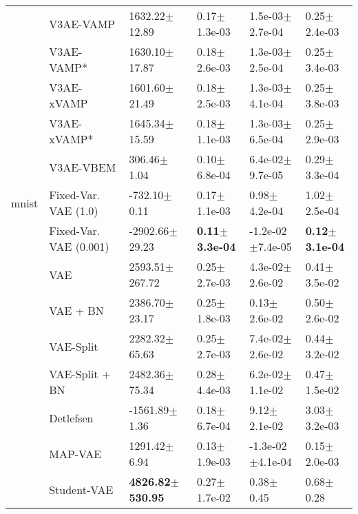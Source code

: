 \begin{tabular}{llllll}
             & V3AE-VAMP &            1632.22$\pm$12.89 &              0.17$\pm$1.3e-03 &            1.5e-03$\pm$2.7e-04 &              0.25$\pm$2.4e-03 \\
             & V3AE-VAMP* &            1630.10$\pm$17.87 &              0.18$\pm$2.6e-03 &            1.3e-03$\pm$2.5e-04 &              0.25$\pm$3.4e-03 \\
             & V3AE-xVAMP &            1601.60$\pm$21.49 &              0.18$\pm$2.5e-03 &            1.3e-03$\pm$4.1e-04 &              0.25$\pm$3.8e-03 \\
             & V3AE-xVAMP* &            1645.34$\pm$15.59 &              0.18$\pm$1.1e-03 &            1.3e-03$\pm$6.5e-04 &              0.25$\pm$2.9e-03 \\
             & V3AE-VBEM &              306.46$\pm$1.04 &              0.10$\pm$6.8e-04 &            6.4e-02$\pm$9.7e-05 &              0.29$\pm$3.3e-04 \\
mnist & Fixed-Var. VAE (1.0) &             -732.10$\pm$0.11 &              0.17$\pm$1.1e-03 &               0.98$\pm$4.2e-04 &              1.02$\pm$2.5e-04 \\
             & Fixed-Var. VAE (0.001) &           -2902.66$\pm$29.23 &     \textbf{0.11$\pm$3.3e-04} &           -1.2e-02$\pm$7.4e-05 &     \textbf{0.12$\pm$3.1e-04} \\
             & VAE &           2593.51$\pm$267.72 &              0.25$\pm$2.7e-03 &            4.3e-02$\pm$2.6e-02 &              0.41$\pm$3.5e-02 \\
             & VAE + BN &            2386.70$\pm$23.17 &              0.25$\pm$1.8e-03 &               0.13$\pm$2.6e-02 &              0.50$\pm$2.6e-02 \\
             & VAE-Split &            2282.32$\pm$65.63 &              0.25$\pm$2.7e-03 &            7.4e-02$\pm$2.6e-02 &              0.44$\pm$3.2e-02 \\
             & VAE-Split + BN &            2482.36$\pm$75.34 &              0.28$\pm$4.4e-03 &            6.2e-02$\pm$1.1e-02 &              0.47$\pm$1.5e-02 \\
             & Detlefsen &            -1561.89$\pm$1.36 &              0.18$\pm$6.7e-04 &               9.12$\pm$2.1e-02 &              3.03$\pm$3.2e-03 \\
             & MAP-VAE &             1291.42$\pm$6.94 &              0.13$\pm$1.9e-03 &           -1.3e-02$\pm$4.1e-04 &              0.15$\pm$2.0e-03 \\
             & Student-VAE &  \textbf{4826.82$\pm$530.95} &              0.27$\pm$1.7e-02 &                  0.38$\pm$0.45 &                 0.68$\pm$0.28 \\

\end{tabular}
